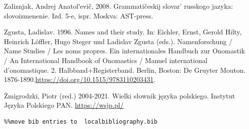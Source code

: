 \documentclass[output=paper]{langscibook}
\begin{document}
Zaliznjak, Andrej Anatolʹevič, 2008. Grammatičeskij slovar' russkogo jazyka: slovoizmenenie. Izd. 5-e, ispr. Moskva: AST-press.

Zgusta, Ladislav. 1996. Names and their study. In: Eichler, Ernst, Gerold Hilty, Heinrich Löffler, Hugo Steger und Ladislav Zgusta (eds.). Namenforschung / Name Studies / Les noms propres. Ein internationales Handbuch zur Onomastik / An International Handbook of Onomastics / Manuel international d'onomastique. 2. Halbband+Registerband. Berlin, Boston: De Gruyter Mouton. 1876-1890.\url{https://doi.org/10.1515/9783110203431}. 

Żmigrodzki, Piotr (red.) 2004-2021. Wielki słownik języka polskiego. Instytut Języka Polskiego PAN. \url{https://wsjp.pl/}


\begin{verbatim}%%move bib entries to  localbibliography.bib
\end{verbatim}
\sloppy\printbibliography[heading=subbibliography,notkeyword=this]
\end{document}
